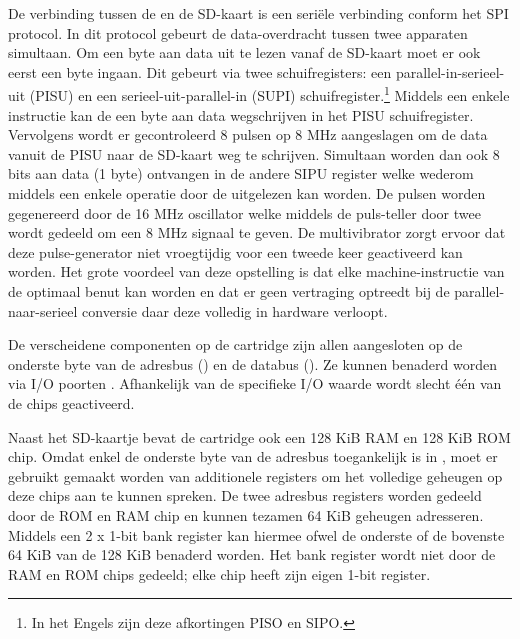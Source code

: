 De verbinding tussen de  en de SD-kaart is een seriële verbinding conform het SPI protocol. In dit protocol gebeurt de data-overdracht tussen twee apparaten simultaan. Om een byte aan data uit te lezen vanaf de SD-kaart moet er ook eerst een byte ingaan. Dit gebeurt via twee schuifregisters: een parallel-in-serieel-uit (PISU) en een serieel-uit-parallel-in (SUPI) schuifregister.\footnote{In het Engels zijn deze afkortingen PISO en SIPO.} Middels een enkele instructie kan de  een byte aan data wegschrijven in het PISU schuifregister. Vervolgens wordt er gecontroleerd 8 pulsen op 8 MHz aangeslagen om de data vanuit de PISU naar de SD-kaart weg te schrijven. Simultaan worden dan ook 8 bits aan data (1 byte) ontvangen in de andere SIPU register welke wederom middels een enkele operatie door de  uitgelezen kan worden. De pulsen worden gegenereerd door de 16 MHz oscillator welke middels de puls-teller door twee wordt gedeeld om een 8 MHz signaal te geven. De multivibrator zorgt ervoor dat deze pulse-generator niet vroegtijdig voor een tweede keer geactiveerd kan worden. Het grote voordeel van deze opstelling is dat elke machine-instructie van de  optimaal benut kan worden en dat er geen vertraging optreedt bij de parallel-naar-serieel conversie daar deze volledig in hardware verloopt.


De verscheidene componenten op de  cartridge zijn allen aangesloten op de onderste byte van de adresbus () en de databus (). Ze kunnen benaderd worden via I/O poorten . Afhankelijk van de specifieke I/O waarde wordt slecht één van de chips geactiveerd.


Naast het SD-kaartje bevat de  cartridge ook een 128 KiB RAM en 128 KiB ROM chip. Omdat enkel de onderste byte van de adresbus toegankelijk is in , moet er gebruikt gemaakt worden van additionele registers om het volledige geheugen op deze chips aan te kunnen spreken. De twee adresbus registers worden gedeeld door de ROM en RAM chip en kunnen tezamen 64 KiB geheugen adresseren. Middels een 2 x 1-bit bank register kan hiermee ofwel de onderste of de bovenste 64 KiB van de 128 KiB benaderd worden. Het bank register wordt niet door de RAM en ROM chips gedeeld; elke chip heeft zijn eigen 1-bit register.

